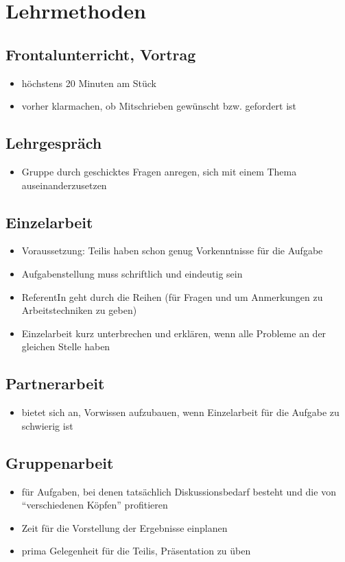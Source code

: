 \chapter{Lehrmethoden}
\section{Frontalunterricht, Vortrag}
\begin{itemize}
 \item höchstens 20 Minuten am Stück
 \item vorher klarmachen, ob Mitschrieben gewünscht bzw. gefordert ist
\end{itemize}

\section{Lehrgespräch}
\begin{itemize}
 \item Gruppe durch geschicktes Fragen anregen, sich mit einem Thema auseinanderzusetzen
\end{itemize}

\section{Einzelarbeit}
\begin{itemize}
 \item Voraussetzung: Teilis haben schon genug Vorkenntnisse für die Aufgabe
 \item Aufgabenstellung muss schriftlich und eindeutig sein
 \item ReferentIn geht durch die Reihen (für Fragen und um Anmerkungen zu Arbeitstechniken zu geben)
 \item Einzelarbeit kurz unterbrechen und erklären, wenn alle Probleme an der gleichen Stelle haben
\end{itemize}

\section{Partnerarbeit}
\begin{itemize}
 \item bietet sich an, Vorwissen aufzubauen, wenn Einzelarbeit für die Aufgabe zu schwierig ist
\end{itemize}

\section{Gruppenarbeit}
\begin{itemize}
 \item für Aufgaben, bei denen tatsächlich Diskussionsbedarf besteht und die von ``verschiedenen Köpfen'' profitieren
 \item Zeit für die Vorstellung der Ergebnisse einplanen
 \item prima Gelegenheit für die Teilis, Präsentation zu üben
\end{itemize}

